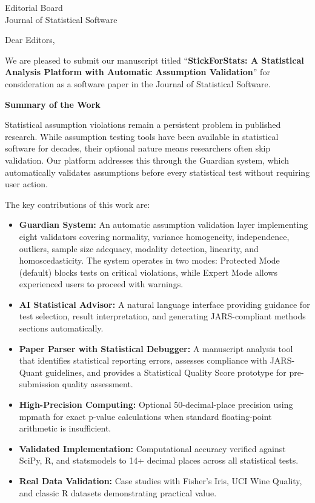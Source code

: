 \documentclass[11pt]{letter}
\begin{document}
\begin{letter}{Editorial Board\\Journal of Statistical Software}

\opening{Dear Editors,}

We are pleased to submit our manuscript titled ``\textbf{StickForStats: A Statistical Analysis Platform with Automatic Assumption Validation}'' for consideration as a software paper in the Journal of Statistical Software.

\textbf{Summary of the Work}

Statistical assumption violations remain a persistent problem in published research. While assumption testing tools have been available in statistical software for decades, their optional nature means researchers often skip validation. Our platform addresses this through the Guardian system, which automatically validates assumptions before every statistical test without requiring user action.

The key contributions of this work are:

\begin{itemize}
    \item \textbf{Guardian System:} An automatic assumption validation layer implementing eight validators covering normality, variance homogeneity, independence, outliers, sample size adequacy, modality detection, linearity, and homoscedasticity. The system operates in two modes: Protected Mode (default) blocks tests on critical violations, while Expert Mode allows experienced users to proceed with warnings.
    \item \textbf{AI Statistical Advisor:} A natural language interface providing guidance for test selection, result interpretation, and generating JARS-compliant methods sections automatically.
    \item \textbf{Paper Parser with Statistical Debugger:} A manuscript analysis tool that identifies statistical reporting errors, assesses compliance with JARS-Quant guidelines, and provides a Statistical Quality Score prototype for pre-submission quality assessment.
    \item \textbf{High-Precision Computing:} Optional 50-decimal-place precision using mpmath for exact p-value calculations when standard floating-point arithmetic is insufficient.
    \item \textbf{Validated Implementation:} Computational accuracy verified against SciPy, R, and statsmodels to 14+ decimal places across all statistical tests.
    \item \textbf{Real Data Validation:} Case studies with Fisher's Iris, UCI Wine Quality, and classic R datasets demonstrating practical value.
\end{itemize}


\end{letter}
\end{document}
